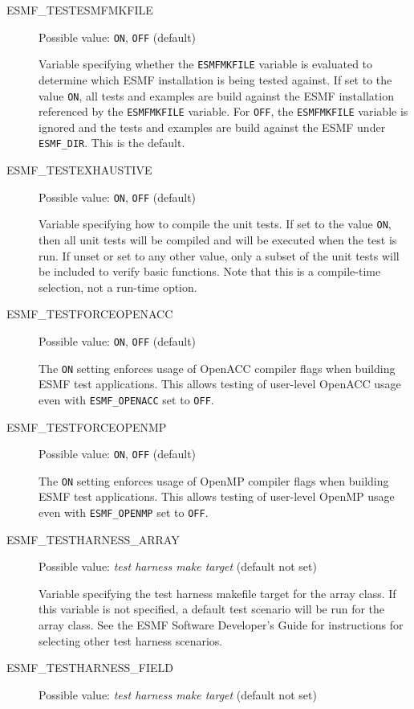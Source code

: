 \begin{description}
\item[ESMF\_TESTESMFMKFILE]
Possible value: {\tt ON}, {\tt OFF} (default)

Variable specifying whether the {\tt ESMFMKFILE} variable is evaluated to
determine which ESMF installation is being tested against. If set to the
value {\tt ON}, all tests and examples are build against the ESMF installation
referenced by the {\tt ESMFMKFILE} variable. For {\tt OFF}, the
{\tt ESMFMKFILE} variable is ignored and the tests and examples are build
against the ESMF under {\tt ESMF\_DIR}. This is the default.

\item[ESMF\_TESTEXHAUSTIVE]
Possible value: {\tt ON}, {\tt OFF} (default)

Variable specifying how to compile the unit tests. If set to the value {\tt ON},
then all unit tests will be compiled and will be executed when the test is
run.  If unset or set to any other value, only a subset of the unit tests
will be included to verify basic functions. Note that this is a compile-time
selection, not a run-time option.

\item[ESMF\_TESTFORCEOPENACC]
Possible value: {\tt ON}, {\tt OFF} (default)

The {\tt ON} setting enforces usage of OpenACC compiler flags when building ESMF test applications. This allows testing of user-level OpenACC usage even with {\tt ESMF\_OPENACC} set to {\tt OFF}.

\item[ESMF\_TESTFORCEOPENMP]
Possible value: {\tt ON}, {\tt OFF} (default)

The {\tt ON} setting enforces usage of OpenMP compiler flags when building ESMF test applications. This allows testing of user-level OpenMP usage even with {\tt ESMF\_OPENMP} set to {\tt OFF}.

\item[ESMF\_TESTHARNESS\_ARRAY]
Possible value: {\em test harness make target} (default not set)

Variable specifying the test harness makefile target for the array class.  If this variable is not specified, a default test scenario will be run for the array class.  See the ESMF Software Developer's Guide for instructions for selecting other test harness scenarios.

\item[ESMF\_TESTHARNESS\_FIELD]
Possible value: {\em test harness make target} (default not set)


\end{description}
